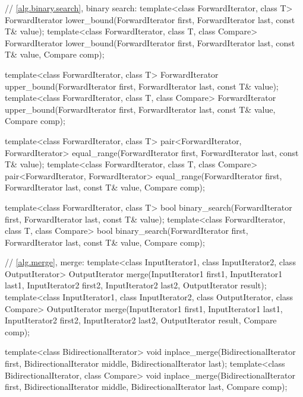 \begin{codeblock}
{  // \ref{alg.binary.search}, binary search:
  template<class ForwardIterator, class T>
    ForwardIterator lower_bound(ForwardIterator first, ForwardIterator last,
                                const T& value);
  template<class ForwardIterator, class T, class Compare>
    ForwardIterator lower_bound(ForwardIterator first, ForwardIterator last,
                                const T& value, Compare comp);

  template<class ForwardIterator, class T>
    ForwardIterator upper_bound(ForwardIterator first, ForwardIterator last,
                                const T& value);
  template<class ForwardIterator, class T, class Compare>
    ForwardIterator upper_bound(ForwardIterator first, ForwardIterator last,
                                const T& value, Compare comp);

  template<class ForwardIterator, class T>
    pair<ForwardIterator, ForwardIterator>
      equal_range(ForwardIterator first, ForwardIterator last,
                  const T& value);
  template<class ForwardIterator, class T, class Compare>
    pair<ForwardIterator, ForwardIterator>
      equal_range(ForwardIterator first, ForwardIterator last,
                  const T& value, Compare comp);

  template<class ForwardIterator, class T>
    bool binary_search(ForwardIterator first, ForwardIterator last,
                       const T& value);
  template<class ForwardIterator, class T, class Compare>
    bool binary_search(ForwardIterator first, ForwardIterator last,
                       const T& value, Compare comp);

  // \ref{alg.merge}, merge:
  template<class InputIterator1, class InputIterator2, class OutputIterator>
    OutputIterator merge(InputIterator1 first1, InputIterator1 last1,
                         InputIterator2 first2, InputIterator2 last2,
                         OutputIterator result);
  template<class InputIterator1, class InputIterator2, class OutputIterator,
     class Compare>
    OutputIterator merge(InputIterator1 first1, InputIterator1 last1,
                         InputIterator2 first2, InputIterator2 last2,
                         OutputIterator result, Compare comp);

  template<class BidirectionalIterator>
    void inplace_merge(BidirectionalIterator first,
                       BidirectionalIterator middle,
                       BidirectionalIterator last);
  template<class BidirectionalIterator, class Compare>
    void inplace_merge(BidirectionalIterator first,
                       BidirectionalIterator middle,
                       BidirectionalIterator last, Compare comp);

}
\end{codeblock}
